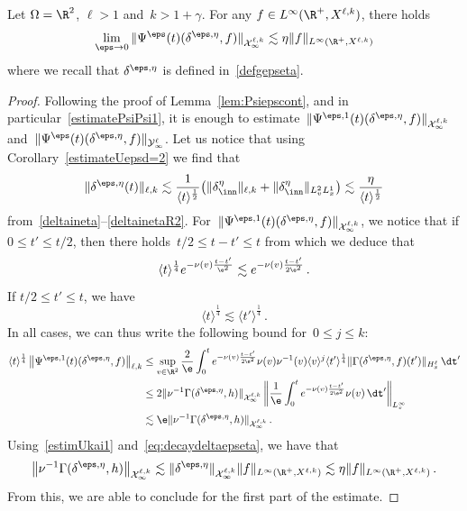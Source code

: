 \begin{lemm}\label{lem:PsiepscontR2}
Let $\Omega = \R^2$, $\ell>1$ and~${k>1+\gamma}$. For any $f \in L^\infty(\R^+, X^{\ell,k})$, there holds
\[
\lim_{\eps \to 0} \|\Psi^\eps(t) (\delta^{\eps,\eta},f) \|_{\mathcal{X}^{\ell,k}_\infty} \lesssim \eta \|f\|_{L^\infty(\R^+, X^{\ell,k})}
\]
where we recall that $\delta^{\eps,\eta}$ is defined in~\eqref{defgepseta}.
\end{lemm}
\begin{proof}
Following the proof of Lemma~\ref{lem:Psiepscont}, and in particular~\eqref{estimatePsiPsi1}, it is enough to estimate~$\|\Psi^{\eps,1}(t)(\delta^{\eps,\eta},f) \|_{\mathcal{X}^{\ell,k}_\infty}$ and~$\|\Psi^{\eps}(t)(\delta^{\eps,\eta},f) \|_{\mathcal{Y}^{\ell}_\infty}$. Let us notice that using Corollary~\ref{estimateUepsd=2} we find that
\begin{equation}\label{eq:decaydeltaepseta}
\|\delta^{\eps,\eta}(t) \|_{\ell,k}\lesssim \frac{1}{\langle t \rangle^\frac12} \big(\|\delta^\eta_{\inn}\|_{\ell,k} + \|\delta^\eta_{\inn}\|_{L^2_vL^1_x} \big) \lesssim \frac{\eta}{\langle t \rangle^\frac12}
\end{equation}
from~\eqref{deltaineta}--\eqref{deltainetaR2}. For~$\|\Psi^{\eps,1}(t)(\delta^{\eps,\eta},f) \|_{\mathcal{X}^{\ell,k}_\infty}$, we notice that if $0 \le {t'} \le t/2$, then there holds~$t/2 \le t-{t'} \le t$ from which we deduce that
\[
\langle t \rangle^{\frac14} e^{-\nu(v)\frac{t-{t'}}{\e^2}} \lesssim e^{-\nu(v)\frac{t-{t'}}{2\e^2}}\,.
\]
If $t/2 \le {t'} \le t$, we have
\[
\langle t \rangle^{\frac14} \lesssim \langle t'\rangle^{\frac14} \,.
\]
In all cases, we can thus write the following bound for~$0\leq j \leq k$:
\begin{align*}
\langle t \rangle^{\frac14} \left\|\Psi^{\eps,1}(t)(\delta^{\eps,\eta},f) \right\|_{{\ell,k}}
&\le\sup_{v \in \R^2} \frac{2}{\e} \int_0^t e^{-\nu(v)\frac{t-{t'}}{2\e^2}} \nu(v) \nu^{-1}(v) \langle v \rangle^j \langle t'\rangle^{\frac14}\| \Gamma(\delta^{\eps,\eta},f) ({t'})\|_{H^\ell_x} \, \dt' \\
&\le 2\| \nu^{-1} \Gamma (\delta^{\eps,\eta},h) \|_{\mathcal{X}_\infty^{\ell,k} } \left\| \frac{1}{\e} \int_0^t e^{-\nu(v)\frac{t-{t'}}{2\e^2}} \nu(v) \, \dt' \right\|_{L^\infty_v} \\
&\lesssim \e \| \nu^{-1} \Gamma (\delta^{\eps,\eta},h) \|_{\mathcal{X}_\infty^{\ell,k} }\,.
\end{align*}
Using~\eqref{estimUkai1} and~\eqref{eq:decaydeltaepseta}, we have that
\[
\left\| \nu^{-1} \Gamma (\delta^{\eps,\eta},h) \right\|_{\mathcal{X}^{\ell,k}_\infty} \lesssim \|\delta^{\eps,\eta}\|_{\mathcal{X}^{\ell,k}_\infty} \|f\|_{L^\infty(\R^+, X^{\ell,k})} \lesssim \eta \|f\|_{L^\infty(\R^+, X^{\ell,k})}\,.
\]
From this, we are able to conclude for the first part of the estimate.


\end{proof}
